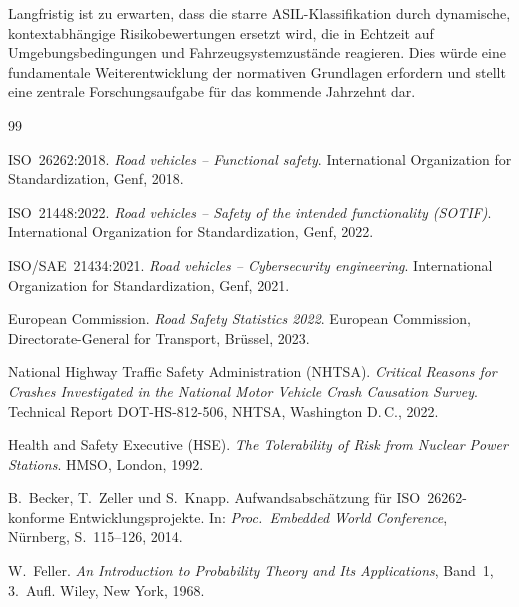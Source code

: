 ﻿\documentclass[a4paper,12pt]{article}
\theoremstyle{definition}
\begin{document}
Langfristig ist zu erwarten, dass die starre ASIL-Klassifikation
durch dynamische, kontextabhängige Risikobewertungen ersetzt wird,
die in Echtzeit auf Umgebungsbedingungen und Fahrzeugsystemzustände
reagieren. Dies würde eine fundamentale Weiterentwicklung der
normativen Grundlagen erfordern und stellt eine zentrale
Forschungsaufgabe für das kommende Jahrzehnt dar.

\begin{thebibliography}{99}

ISO~26262:2018.
\newblock \textit{Road vehicles -- Functional safety}.
\newblock International Organization for Standardization,
  Genf, 2018.

ISO~21448:2022.
\newblock \textit{Road vehicles -- Safety of the intended
  functionality (SOTIF)}.
\newblock International Organization for Standardization,
  Genf, 2022.

ISO/SAE~21434:2021.
\newblock \textit{Road vehicles -- Cybersecurity engineering}.
\newblock International Organization for Standardization,
  Genf, 2021.

European Commission.
\newblock \textit{Road Safety Statistics 2022}.
\newblock European Commission, Directorate-General for Transport,
  Brüssel, 2023.

National Highway Traffic Safety Administration (NHTSA).
\newblock \textit{Critical Reasons for Crashes Investigated in
  the National Motor Vehicle Crash Causation Survey}.
\newblock Technical Report DOT-HS-812-506, NHTSA,
  Washington D.\,C., 2022.

Health and Safety Executive (HSE).
\newblock \textit{The Tolerability of Risk from Nuclear Power
  Stations}.
\newblock HMSO, London, 1992.

B.~Becker, T.~Zeller und S.~Knapp.
\newblock Aufwandsabschätzung für ISO~26262-konforme
  Entwicklungsprojekte.
\newblock In: \textit{Proc.\ Embedded World Conference},
  Nürnberg, S.~115--126, 2014.

W.~Feller.
\newblock \textit{An Introduction to Probability Theory and Its
  Applications}, Band~1, 3.~Aufl.
\newblock Wiley, New York, 1968.


\end{thebibliography}
\end{document}
